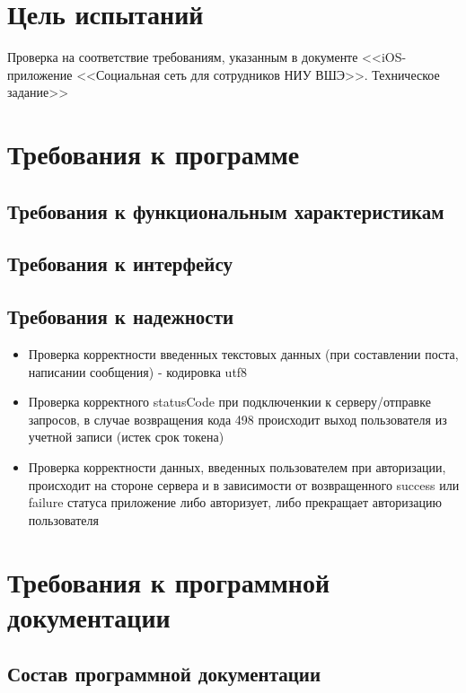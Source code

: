 \documentclass[a4paper,12pt]{article}
\begin{document}
					\newpage
	\section{Цель испытаний}
	
	Проверка на соответствие требованиям, указанным в документе <<iOS-приложение <<Социальная сеть для сотрудников НИУ ВШЭ>>. Техническое задание>>
	
					\newpage 
	\section{Требования к программе}
	\subsection{Требования к функциональным характеристикам} \label{subsec:requirements}
	
	\subsection{Требования к интерфейсу}
	
	\subsection{Требования к надежности}
	\begin{itemize}
		\item Проверка корректности введенных текстовых данных (при составлении поста, написании сообщения) - кодировка utf8
		\item Проверка корректного statusCode при подключенкии к серверу/отправке запросов, в случае возвращения кода 498 происходит выход пользователя из учетной записи (истек срок токена)
		\item Проверка корректности данных, введенных пользователем при авторизации, происходит на стороне сервера и в зависимости от возвращенного success или failure статуса приложение либо авторизует, либо прекращает авторизацию пользователя
	\end{itemize}
	
						\newpage
	\section{Требования к программной документации}
	\subsection{Состав программной документации}
	
	
\end{document}
